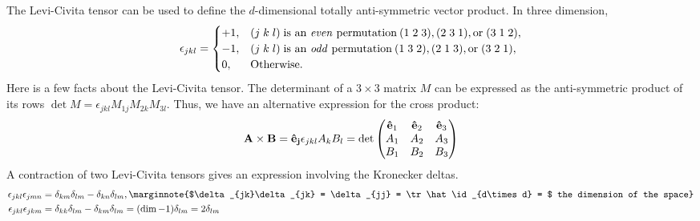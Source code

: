 \begin{mybox}
	The Levi-Civita tensor can be used to define the $d$-dimensional totally anti-symmetric vector product. In three dimension,
	\begin{align}
		\epsilon_{jkl} = 
		\begin{cases}
			+1, &(j\;k\;l) \; \textrm{is an \emph{even} permutation} \: (1\; 2\; 3), (2\; 3\; 1), \textrm{or} \; (3\; 1\; 2), \\
			-1, &(j\;k\;l) \; \textrm{is an \emph{odd} permutation} \: (1\; 3\; 2), (2\; 1\; 3), \textrm{or} \; (3\; 2\; 1), \\
			0, &\mathrm{Otherwise}.
		\end{cases}
	\end{align} 
	Here is a few facts about the Levi-Civita tensor. The determinant of a $3\times3$ matrix $M$ can be expressed as the anti-symmetric product of its rows $\det M = \epsilon_{jkl} M_{1j}M_{2k} M_{3l}$. Thus, we have an alternative expression for the cross product:
	\begin{align}
		\vb{A \times B} = \vb{\hat e_j} \epsilon_{jkl} A_k B_l = \det \mqty(\vb{\hat e}_1 & \vb{\hat e}_2 & \vb{\hat e}_3  \\ A_1 & A_2 & A_3 \\ B_1 & B_2 & B_3 ) 
	\end{align}
	A contraction of two Levi-Civita tensors gives an expression involving the Kronecker deltas.
	\begin{align}
		\epsilon_{jkl}\epsilon_{jmn} &= \delta_{km} \delta_{lm} - \delta_{kn} \delta_{lm}, 
		\marginnote{$\delta_{jk}\delta_{jk} = \delta_{jj} = \tr \hat\id_{d\times d} = $ the dimension of the space}\\
		\epsilon_{jkl}\epsilon_{jkm} &= \delta_{kk}\delta_{lm} - \delta_{km} \delta_{lm} = (\dim-1)\delta_{lm} = 2\delta_{lm}
	\end{align}
\end{mybox}

